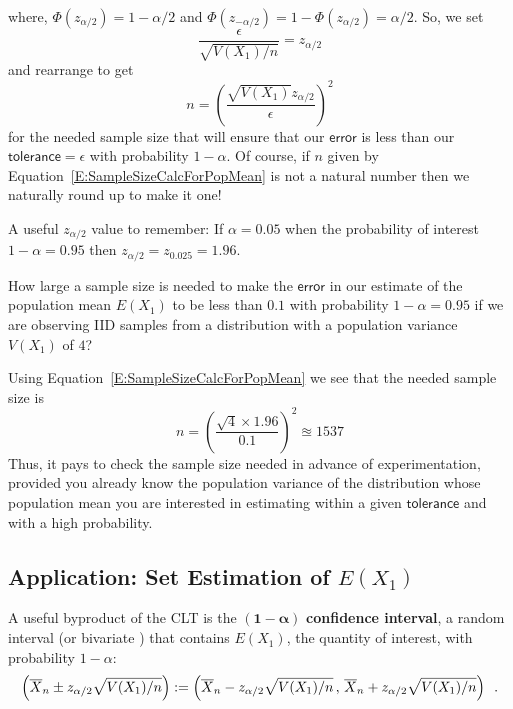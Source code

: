 \vspace{1.5cm}

where, $\Phi(z_{\alpha/2}) = 1-\alpha/2$ and $\Phi(z_{-\alpha/2}) = 1- \Phi(z_{\alpha/2}) = \alpha/2$.  
So, we set
\[
\frac{\epsilon}{\sqrt{V(X_1)/n}} = z_{\alpha/2}
\]
and rearrange to get
\begin{equation}\label{E:SampleSizeCalcForPopMean}
n = \left( \frac{\sqrt{V(X_1)} z_{\alpha/2}}{\epsilon}\right)^2
\end{equation}
for the needed sample size that will ensure that our $\mathsf{error}$ is less than our $\mathsf{tolerance}=\epsilon$ with probability $1-\alpha$.  Of course, if $n$ given by Equation~\eqref{E:SampleSizeCalcForPopMean} is not a natural number then we naturally round up to make it one!

A useful $z_{\alpha/2}$ value to remember: If $\alpha=0.05$ when the probability of interest $1-\alpha=0.95$ then $z_{\alpha/2} = z_{0.025} = 1.96$.

\begin{example}\label{EgHowLargeASampleSizeToEstimateMeanWithinTOL}
How large a sample size is needed to make the $\mathsf{error}$ in our estimate of the population mean $E(X_1)$ to be less than $0.1$ with probability $1-\alpha=0.95$ if we are observing IID samples from a distribution with a population variance $V(X_1)$ of $4$?

Using Equation~\eqref{E:SampleSizeCalcForPopMean} we see that the needed sample size is
\[
n =  \left( \frac{\sqrt{4} \times 1.96}{0.1} \right)^2 \approxeq 1537
\]
Thus, it pays to check the sample size needed in advance of experimentation, provided you already know the population variance of the distribution whose population mean you are interested in estimating within a given $\mathsf{tolerance}$ and with a high probability. 
\end{example}

\subsection{Application: Set Estimation of $E(X_1)$}

A useful byproduct of the CLT is the $\mathbf{(1-\alpha)}$ {\bf confidence interval}, a random interval (or bivariate \rv) that contains $E(X_1)$, the quantity of interest, with probability $1-\alpha$: 
\begin{equation}\label{E:ConfIntForPopMean}
\left( \overline{X}_n \pm z_{\alpha/2} \sqrt{V(X_1)/n} \right) :=
\left( \overline{X}_n - z_{\alpha/2} \sqrt{V(X_1)/n} \, , \, \overline{X}_n + z_{\alpha/2} \sqrt{V(X_1)/n} \right) \enspace .
\end{equation}


